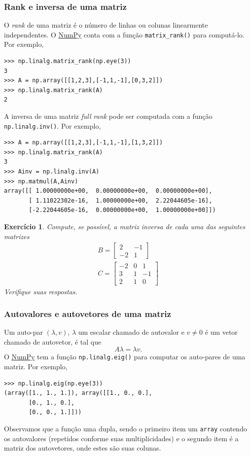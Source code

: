 \documentclass[12pt]{article}
\newtheorem{exr}{Exercício}[section]
\begin{document}
\subsubsection{Rank e inversa de uma matriz}

O \emph{rank} de uma matriz é o número de linhas ou colunas linearmente independentes. O \href{https://numpy.org/}{NumPy} conta com a função \lstinline+matrix_rank()+ para computá-lo. Por exemplo,
\begin{lstlisting}
>>> np.linalg.matrix_rank(np.eye(3))
3
>>> A = np.array([[1,2,3],[-1,1,-1],[0,3,2]])
>>> np.linalg.matrix_rank(A)
2
\end{lstlisting}

A inversa de uma matriz \emph{full rank} pode ser computada com a função \lstinline+np.linalg.inv()+. Por exemplo,
\begin{lstlisting}
>>> A = np.array([[1,2,3],[-1,1,-1],[1,3,2]])
>>> np.linalg.matrix_rank(A)
3
>>> Ainv = np.linalg.inv(A)
>>> np.matmul(A,Ainv)
array([[ 1.00000000e+00,  0.00000000e+00,  0.00000000e+00],
       [ 1.11022302e-16,  1.00000000e+00,  2.22044605e-16],
       [-2.22044605e-16,  0.00000000e+00,  1.00000000e+00]])
\end{lstlisting}

\begin{exr}
  Compute, se possível, a matriz inversa de cada uma das seguintes matrizes
  \begin{gather}
    B =
    \begin{bmatrix}
      2 & -1\\
      -2 & 1
    \end{bmatrix}\\
    C =
    \begin{bmatrix}
      -2 & 0 & 1\\
      3 & 1 & -1\\
      2 & 1 & 0
    \end{bmatrix}
  \end{gather}
  Verifique suas respostas.
\end{exr}

\subsubsection{Autovalores e autovetores de uma matriz}

Um auto-par $(\lambda, v)$, $\lambda$ um escalar chamado de autovalor e $v\neq 0$ é um vetor chamado de autovetor, é tal que
\begin{equation}
  A\lambda = \lambda v.
\end{equation}
O \href{https://numpy.org/}{NumPy} tem a função \lstinline+np.linalg.eig()+ para computar os auto-pares de uma matriz. Por exemplo,
\begin{lstlisting}
>>> np.linalg.eig(np.eye(3))
(array([1., 1., 1.]), array([[1., 0., 0.],
       [0., 1., 0.],
       [0., 0., 1.]]))
\end{lstlisting}
Observamos que a função uma dupla, sendo o primeiro item um \lstinline+array+ contendo os autovalores (repetidos conforme suas multiplicidades) e o segundo item é a matriz dos autovetores, onde estes são suas colunas.
\end{document}
